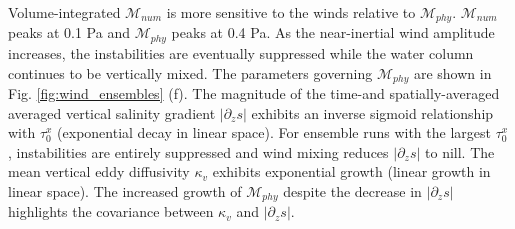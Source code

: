 Volume-integrated $\mathcal{M}_{num}$ is more sensitive to the winds relative to $\mathcal{M}_{phy}$. $\mathcal{M}_{num}$ peaks at 0.1 Pa and $\mathcal{M}_{phy}$ peaks at 0.4 Pa. As the near-inertial wind amplitude increases, the instabilities are eventually suppressed while the water column continues to be vertically mixed. The parameters governing $\mathcal{M}_{phy}$ are shown in Fig. \ref{fig:wind_ensembles} (f). The magnitude of the time-and spatially-averaged averaged vertical salinity gradient $|\partial_z s|$ exhibits an inverse sigmoid relationship with $\tau_0^x$ (exponential decay in linear space). For ensemble runs with the largest $\tau_0^x$, instabilities are entirely suppressed and wind mixing reduces $|\partial_z s|$ to nill. The mean vertical eddy diffusivity $\kappa_v$ exhibits exponential growth (linear growth in linear space). The increased growth of $\mathcal{M}_{phy}$ despite the decrease in $|\partial_z s|$ highlights the covariance between $\kappa_v$ and $|\partial_z s|$. 




